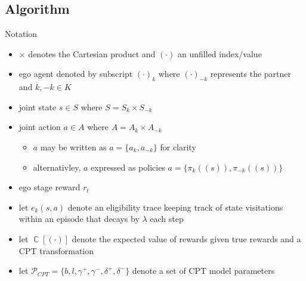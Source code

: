 \documentclass[aspectratio=1610, xcolor=dvipsnames]{packages/beamer}
\DeclareMathOperator{\CPT}{\mathbb{C}}
\newcommand{\joint}[1]{#1}
\begin{document}
\subsection{Algorithm}

\begin{frame}{Notation}
\begin{itemize}
    \item  $\times$ denotes the Cartesian product and $(\cdot)$ an unfilled index/value
    \item ego agent denoted by subscript $(\cdot)_k$ where $(\cdot)_{-k}$ represents the partner and $k,-k \in K$
    \item joint state $\joint{s} \in \joint{S}$ where $ \joint{S} = S_{k} \times S_{-k}$
    \item joint action $\joint{a} \in \joint{A}$ where $ \joint{A} = A_{k} \times A_{-k}$
    \begin{itemize}
        \item $\joint{a}$ may be written as $\joint{a}=\{a_k,a_{-k}\}$ for clarity
        \item alternativley, $\joint{a}$ expressed as policies $\joint{a}=\{\pi_{k}(\joint(s)),\pi_{-k}(\joint(s))\}$
    \end{itemize}
    \item ego stage reward $r_t$
    \item let $e_k(\joint{s},\joint{a})$ denote an eligibility trace keeping track of state visitations within an episode that decays by $\lambda$ each step
    \item let $\CPT[(\cdot)]$ denote the expected value of rewards given true rewards and a CPT transformation
    \item let $\mathcal{P}_{CPT} = \{b,l,\gamma^{+},\gamma^{-},\delta^{+},\delta^{-}\}$ denote a set of CPT model parameters
\end{itemize}

\end{frame}
\end{document}
